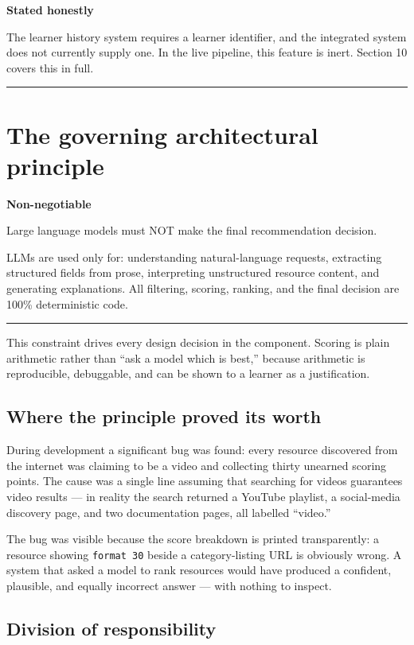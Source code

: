 \documentclass[11pt,a4paper]{article}
\newcommand{\code}[1]{\texttt{\small #1}}
\newenvironment{callout}[1]
  {\par\vspace{8pt}\noindent
   \begin{lrbox}{\calloutbox}
   \begin{minipage}{\dimexpr\textwidth-2\fboxsep-8pt\relax}
   \vspace{4pt}
   {\bfseries\color{navy}#1}\par\vspace{4pt}}
  {\vspace{4pt}\end{minipage}%
   \end{lrbox}%
   \noindent\textcolor{navy}{\rule[-\dp\calloutbox]{3pt}{\dimexpr\ht\calloutbox+\dp\calloutbox\relax}}%
   \colorbox{headshade}{\usebox{\calloutbox}}%
   \par\vspace{10pt}}
\begin{document}
\begin{callout}{Stated honestly}
The learner history system requires a learner identifier, and the integrated
system does not currently supply one. In the live pipeline, this feature is
inert. Section 10 covers this in full.
\end{callout}

\newpage
\section{The governing architectural principle}

\begin{callout}{Non-negotiable}
Large language models must NOT make the final recommendation decision.
\par\vspace{4pt}
LLMs are used only for: understanding natural-language requests, extracting
structured fields from prose, interpreting unstructured resource content, and
generating explanations. All filtering, scoring, ranking, and the final
decision are 100\% deterministic code.
\end{callout}

This constraint drives every design decision in the component. Scoring is
plain arithmetic rather than ``ask a model which is best,'' because arithmetic
is reproducible, debuggable, and can be shown to a learner as a justification.

\subsection{Where the principle proved its worth}

During development a significant bug was found: every resource discovered from
the internet was claiming to be a video and collecting thirty unearned scoring
points. The cause was a single line assuming that searching for videos
guarantees video results --- in reality the search returned a YouTube
playlist, a social-media discovery page, and two documentation pages, all
labelled ``video.''

The bug was visible because the score breakdown is printed transparently: a
resource showing \code{format 30} beside a category-listing URL is obviously
wrong. A system that asked a model to rank resources would have produced a
confident, plausible, and equally incorrect answer --- with nothing to
inspect.

\subsection{Division of responsibility}
\end{document}
